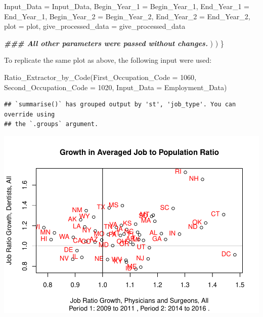 \documentclass[
]{article}
\newenvironment{Shaded}{\begin{snugshade}}{\end{snugshade}}
\newcommand{\AttributeTok}[1]{\textcolor[rgb]{0.77,0.63,0.00}{#1}}
\newcommand{\DecValTok}[1]{\textcolor[rgb]{0.00,0.00,0.81}{#1}}
\newcommand{\DocumentationTok}[1]{\textcolor[rgb]{0.56,0.35,0.01}{\textbf{\textit{#1}}}}
\newcommand{\FunctionTok}[1]{\textcolor[rgb]{0.00,0.00,0.00}{#1}}
\newcommand{\NormalTok}[1]{#1}
\begin{document}
\begin{Shaded}
\begin{Highlighting}[]
      \AttributeTok{Input\_Data =}\NormalTok{ Input\_Data, }
      \AttributeTok{Begin\_Year\_1 =}\NormalTok{ Begin\_Year\_1, }\AttributeTok{End\_Year\_1 =}\NormalTok{ End\_Year\_1,}
      \AttributeTok{Begin\_Year\_2 =}\NormalTok{ Begin\_Year\_2, }\AttributeTok{End\_Year\_2 =}\NormalTok{ End\_Year\_2,}
      \AttributeTok{plot =}\NormalTok{ plot, }\AttributeTok{give\_processed\_data =}\NormalTok{ give\_processed\_data}
      
      \DocumentationTok{\#\#\# All other parameters were passed without changes.}
\NormalTok{    )}
\NormalTok{  )}
\NormalTok{\}}
\end{Highlighting}
\end{Shaded}

To replicate the same plot as above, the following input were used:

\begin{Shaded}
\begin{Highlighting}[]
\FunctionTok{Ratio\_Extractor\_by\_Code}\NormalTok{(}\AttributeTok{First\_Occupation\_Code =} \DecValTok{1060}\NormalTok{, }
                        \AttributeTok{Second\_Occupation\_Code =} \DecValTok{1020}\NormalTok{, }
                        \AttributeTok{Input\_Data =}\NormalTok{ Employment\_Data)}
\end{Highlighting}
\end{Shaded}

\begin{verbatim}
## `summarise()` has grouped output by 'st', 'job_type'. You can override using
## the `.groups` argument.
\end{verbatim}

\includegraphics{BLS_Graphic_Reproduction_files/figure-latex/unnamed-chunk-7-1.pdf}
\end{document}
